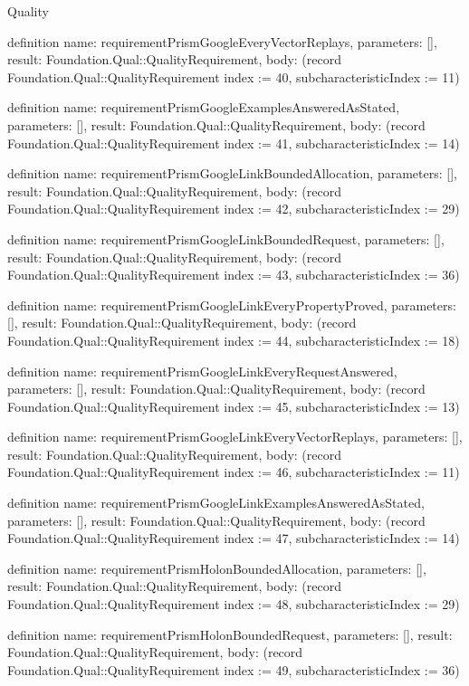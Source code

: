 \begin{lexlean}{Quality}
\begin{semanticmodule}
definition{
  name: requirementPrismGoogleEveryVectorReplays,
  parameters: [],
  result: Foundation.Qual::QualityRequirement,
  body: (record Foundation.Qual::QualityRequirement {index := 40, subcharacteristicIndex := 11})
}

definition{
  name: requirementPrismGoogleExamplesAnsweredAsStated,
  parameters: [],
  result: Foundation.Qual::QualityRequirement,
  body: (record Foundation.Qual::QualityRequirement {index := 41, subcharacteristicIndex := 14})
}

definition{
  name: requirementPrismGoogleLinkBoundedAllocation,
  parameters: [],
  result: Foundation.Qual::QualityRequirement,
  body: (record Foundation.Qual::QualityRequirement {index := 42, subcharacteristicIndex := 29})
}

definition{
  name: requirementPrismGoogleLinkBoundedRequest,
  parameters: [],
  result: Foundation.Qual::QualityRequirement,
  body: (record Foundation.Qual::QualityRequirement {index := 43, subcharacteristicIndex := 36})
}

definition{
  name: requirementPrismGoogleLinkEveryPropertyProved,
  parameters: [],
  result: Foundation.Qual::QualityRequirement,
  body: (record Foundation.Qual::QualityRequirement {index := 44, subcharacteristicIndex := 18})
}

definition{
  name: requirementPrismGoogleLinkEveryRequestAnswered,
  parameters: [],
  result: Foundation.Qual::QualityRequirement,
  body: (record Foundation.Qual::QualityRequirement {index := 45, subcharacteristicIndex := 13})
}

definition{
  name: requirementPrismGoogleLinkEveryVectorReplays,
  parameters: [],
  result: Foundation.Qual::QualityRequirement,
  body: (record Foundation.Qual::QualityRequirement {index := 46, subcharacteristicIndex := 11})
}

definition{
  name: requirementPrismGoogleLinkExamplesAnsweredAsStated,
  parameters: [],
  result: Foundation.Qual::QualityRequirement,
  body: (record Foundation.Qual::QualityRequirement {index := 47, subcharacteristicIndex := 14})
}

definition{
  name: requirementPrismHolonBoundedAllocation,
  parameters: [],
  result: Foundation.Qual::QualityRequirement,
  body: (record Foundation.Qual::QualityRequirement {index := 48, subcharacteristicIndex := 29})
}

definition{
  name: requirementPrismHolonBoundedRequest,
  parameters: [],
  result: Foundation.Qual::QualityRequirement,
  body: (record Foundation.Qual::QualityRequirement {index := 49, subcharacteristicIndex := 36})
}


\end{semanticmodule}
\end{lexlean}
